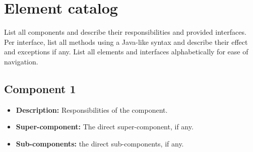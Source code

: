 \documentclass[a4paper,10pt]{article}
\begin{document}
\appendix
\section{Element catalog}\label{app:catalog}
List all components and describe their responsibilities and provided
interfaces.
Per interface, list all methods using a Java-like syntax and describe their
effect and exceptions if any.
List all elements and interfaces alphabetically for ease of navigation.

\subsection{Component 1}
\begin{itemize}
    \item \textbf{Description:} Responsibilities of the component.
    \item \textbf{Super-component:} The direct super-component, if any.
    \item \textbf{Sub-components:} the direct sub-components, if any.
\end{itemize}
\end{document}
